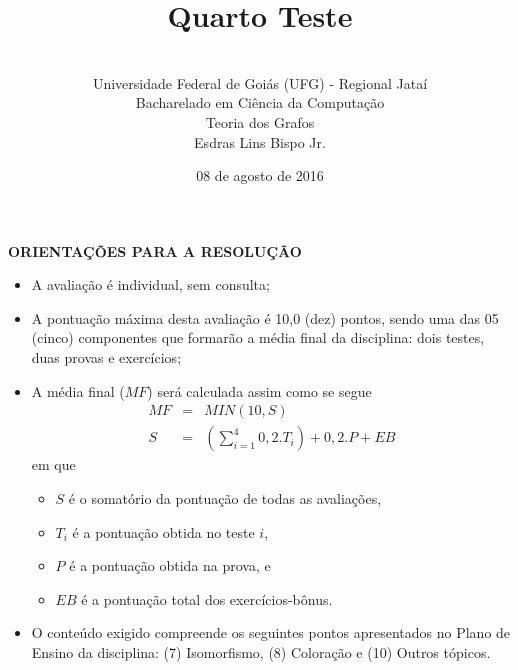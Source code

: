 \documentclass[12pt,a4paper,oneside]{article}
\author{\\Universidade Federal de Goiás (UFG) - Regional Jataí\\Bacharelado em Ciência da Computação \\Teoria dos Grafos \\Esdras Lins Bispo Jr.}
\title{\sc \huge Quarto Teste}
\date{08 de agosto de 2016}
\begin{document}
\maketitle

{\bf ORIENTAÇÕES PARA A RESOLUÇÃO}

\footnotesize

\begin{itemize}
	\item A avaliação é individual, sem consulta;
	\item A pontuação máxima desta avaliação é 10,0 (dez) pontos, sendo uma das 05 (cinco) componentes que formarão a média final da disciplina: dois testes, duas provas e exercícios;
	\item A média final ($MF$) será calculada assim como se segue
	\begin{eqnarray}
		MF & = & MIN(10, S) \nonumber \\
		S & = & (\sum_{i=1}^{4} 0,2.T_i ) + 0,2.P  + EB \nonumber
	\end{eqnarray}
	em que 
	\begin{itemize}
		\item $S$ é o somatório da pontuação de todas as avaliações,
		\item $T_i$ é a pontuação obtida no teste $i$,
		\item $P$ é a pontuação obtida na prova, e
		\item $EB$ é a pontuação total dos exercícios-bônus.
	\end{itemize}
	\item O conteúdo exigido compreende os seguintes pontos apresentados no Plano de Ensino da disciplina: (7) Isomorfismo, (8) Coloração e (10) Outros tópicos.
\end{itemize}

\begin{center}
\end{center}

\newpage

\normalsize
\end{document}
